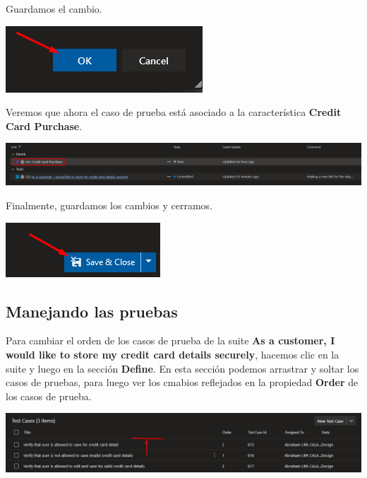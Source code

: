 \documentclass{elsarticle}
\begin{document}
Guardamos el cambio.
\begin{center}
	\includegraphics{img/Screenshot_26.png}
\end{center}

Veremos que ahora el caso de prueba está asociado a la característica \textbf{Credit Card Purchase}.
\begin{center}
	\includegraphics[width=\columnwidth]{img/Screenshot_27.png}
\end{center}

Finalmente, guardamos los cambios y cerramos.
\begin{center}
	\includegraphics{img/Screenshot_28.png}
\end{center}


\subsection{Manejando las pruebas}

Para cambiar el orden de los casos de prueba de la suite \textbf{As a customer, I would like to store my credit card details securely}, hacemos clic en la suite y luego en la sección \textbf{Define}. En esta sección podemos arrastrar y soltar los casos de pruebas, para luego ver los cmabios reflejados en la propiedad \textbf{Order} de los casos de prueba.
\begin{center}
	\includegraphics[width=\columnwidth]{img/Screenshot_29.png}
\end{center}
\end{document}
